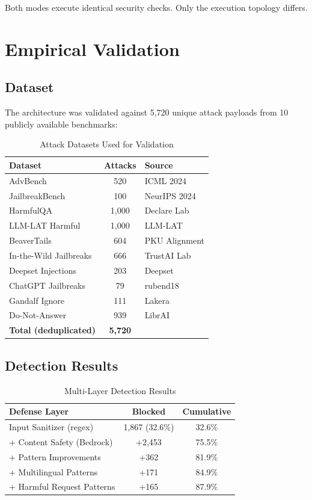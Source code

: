 \documentclass[conference]{IEEEtran}
\begin{document}
Both modes execute identical security checks. Only the execution topology differs.

\section{Empirical Validation}

\subsection{Dataset}

The architecture was validated against 5,720 unique attack payloads from 10 publicly available benchmarks:

\begin{table}[htbp]
\caption{Attack Datasets Used for Validation}
\centering
\begin{tabular}{|l|c|l|}
\hline
\textbf{Dataset} & \textbf{Attacks} & \textbf{Source} \\
\hline
AdvBench & 520 & ICML 2024 \\
\hline
JailbreakBench & 100 & NeurIPS 2024 \\
\hline
HarmfulQA & 1,000 & Declare Lab \\
\hline
LLM-LAT Harmful & 1,000 & LLM-LAT \\
\hline
BeaverTails & 604 & PKU Alignment \\
\hline
In-the-Wild Jailbreaks & 666 & TrustAI Lab \\
\hline
Deepset Injections & 203 & Deepset \\
\hline
ChatGPT Jailbreaks & 79 & rubend18 \\
\hline
Gandalf Ignore & 111 & Lakera \\
\hline
Do-Not-Answer & 939 & LibrAI \\
\hline
\textbf{Total (deduplicated)} & \textbf{5,720} & \\
\hline
\end{tabular}
\end{table}

\subsection{Detection Results}

\begin{table}[htbp]
\caption{Multi-Layer Detection Results}
\centering
\begin{tabular}{|l|c|c|}
\hline
\textbf{Defense Layer} & \textbf{Blocked} & \textbf{Cumulative} \\
\hline
Input Sanitizer (regex) & 1,867 (32.6\%) & 32.6\% \\
\hline
+ Content Safety (Bedrock) & +2,453 & 75.5\% \\
\hline
+ Pattern Improvements & +362 & 81.9\% \\
\hline
+ Multilingual Patterns & +171 & 84.9\% \\
\hline
+ Harmful Request Patterns & +165 & 87.9\% \\
\hline
\end{tabular}
\end{table}
\end{document}
